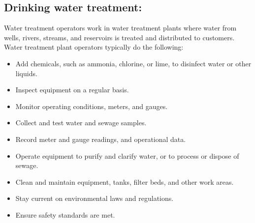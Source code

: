 \subsection{Drinking water treatment:}
Water treatment operators work in water treatment plants where water from wells, rivers, streams, and reservoirs is treated and distributed to customers. Water treatment plant operators typically do the following:
\begin{itemize}
\item Add chemicals, such as ammonia, chlorine, or lime, to disinfect water or other liquids.
\item Inspect equipment on a regular basis.
\item Monitor operating conditions, meters, and gauges.
\item Collect and test water and sewage samples.
\item Record meter and gauge readings, and operational data.
\item Operate equipment to purify and clarify water, or to process or dispose of sewage.
\item Clean and maintain equipment, tanks, filter beds, and other work areas.
\item Stay current on environmental laws and regulations.
\item Ensure safety standards are met.
\end{itemize}
